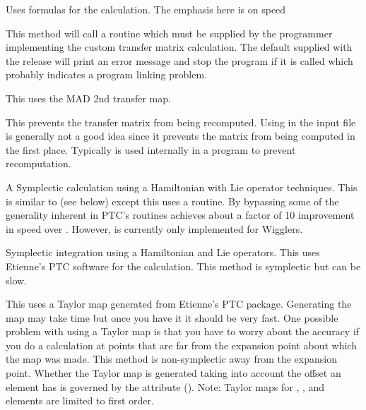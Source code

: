 \begin{description}

\item[\vn{Bmad_Standard}]
Uses formulas for the calculation. The emphasis here is on speed

\item[\vn{Custom}]
This method will call a routine  which must be
supplied by the programmer implementing the custom transfer matrix
calculation. The default  supplied with the
\bmad release will print an error message and stop the program if it
is called which probably indicates a program linking problem.

\item[\vn{MAD}]
This uses the MAD 2nd transfer map.

\item[\vn{None}]
This prevents the transfer matrix from being recomputed.
Using  in the input file is generally not a good idea since
it prevents the matrix from being computed in the first place.
Typically  is used internally in a program to prevent recomputation.

\item[\vn{Symp_Lie_Bmad}]
A Symplectic calculation using a Hamiltonian with Lie operator techniques.
This is similar to  (see below) except this uses a
\bmad routine. By bypassing some of the generality inherent in PTC's routines
 achieves about a factor of 10 improvement in speed over
. However,  is
currently only implemented for Wigglers.

\item[\vn{Symp_Lie_PTC}]
Symplectic integration using a Hamiltonian and Lie operators.
This uses Etienne's PTC software for the calculation.
This method is symplectic but can be slow.

\item[\vn{Taylor}]
This uses a Taylor map generated from Etienne's PTC
package. Generating the map may take time but once you have it it
should be very fast. One possible problem with using a Taylor map is
that you have to worry about the accuracy if you do a calculation at
points that are far from the expansion point about which the map was
made. This method is non-symplectic away from the expansion
point. Whether the Taylor map is generated taking into account the
offset an element has is governed by the 
attribute ().
Note: Taylor maps for , ,
and  elements are limited to first order.


\end{description}
